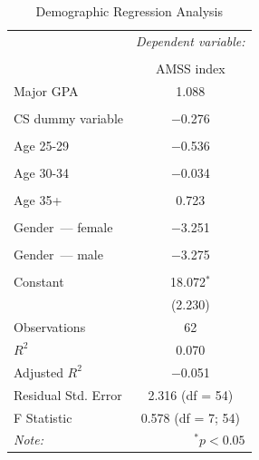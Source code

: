 \begin{table}[!htbp] \centering
  \caption{Demographic Regression Analysis}
  \label{tab:demographics}
  \begin{tabular}{@{\extracolsep{5pt}}lc}
    \toprule
     & \multicolumn{1}{c}{\textit{Dependent variable:}} \\
    \cline{2-2}
    \\[-1.8ex] & AMSS index \\
    \midrule
    Major GPA & 1.088 \\
    &  \\
    CS dummy variable & $-$0.276 \\
    &  \\
    Age 25-29 & $-$0.536 \\
    &  \\
    Age 30-34 & $-$0.034 \\
    &  \\
    Age 35+ & 0.723 \\
    &  \\
    Gender~--- female & $-$3.251 \\
    &  \\
    Gender~--- male & $-$3.275 \\
    &  \\
    Constant & 18.072$^{*}$ \\
    & (2.230) \\
    \midrule
    Observations & 62 \\
    $R^{2}$ & 0.070 \\
    Adjusted $R^{2}$ & $-$0.051 \\
    Residual Std. Error & 2.316 (df = 54) \\
    F Statistic & 0.578 (df = 7; 54) \\
    \bottomrule
    \textit{Note:}  & \multicolumn{1}{r}{$^{*}p<0.05$} \\
  \end{tabular}
\end{table}
